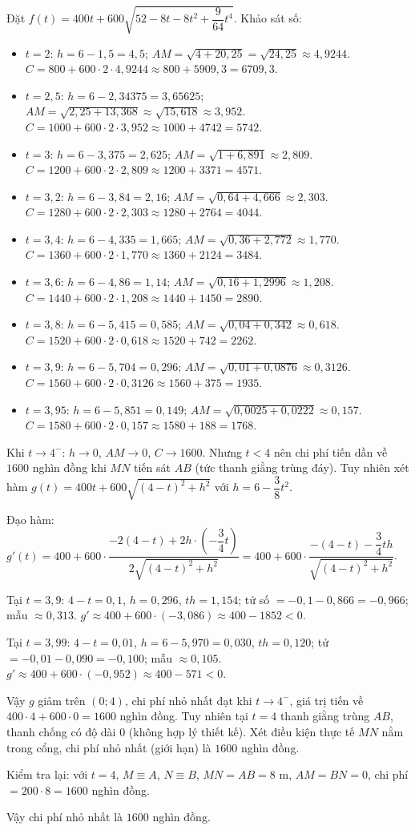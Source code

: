 \begin{bt}
{Đặt $f(t)=400t+600\sqrt{52-8t-8t^2+\dfrac{9}{64}t^4}$. Khảo sát số: 
\begin{itemize}
\item $t=2$: $h=6-1{,}5=4{,}5$; $AM=\sqrt{4+20{,}25}=\sqrt{24{,}25}\approx 4{,}9244$. $C=800+600\cdot 2\cdot 4{,}9244\approx 800+5909{,}3=6709{,}3$.
\item $t=2{,}5$: $h=6-2{,}34375=3{,}65625$; $AM=\sqrt{2{,}25+13{,}368}\approx\sqrt{15{,}618}\approx 3{,}952$. $C=1000+600\cdot 2\cdot 3{,}952\approx 1000+4742=5742$.
\item $t=3$: $h=6-3{,}375=2{,}625$; $AM=\sqrt{1+6{,}891}\approx 2{,}809$. $C=1200+600\cdot 2\cdot 2{,}809\approx 1200+3371=4571$.
\item $t=3{,}2$: $h=6-3{,}84=2{,}16$; $AM=\sqrt{0{,}64+4{,}666}\approx 2{,}303$. $C=1280+600\cdot 2\cdot 2{,}303\approx1280+2764=4044$.
\item $t=3{,}4$: $h=6-4{,}335=1{,}665$; $AM=\sqrt{0{,}36+2{,}772}\approx 1{,}770$. $C=1360+600\cdot 2\cdot 1{,}770\approx1360+2124=3484$.
\item $t=3{,}6$: $h=6-4{,}86=1{,}14$; $AM=\sqrt{0{,}16+1{,}2996}\approx 1{,}208$. $C=1440+600\cdot2\cdot1{,}208\approx1440+1450=2890$.
\item $t=3{,}8$: $h=6-5{,}415=0{,}585$; $AM=\sqrt{0{,}04+0{,}342}\approx 0{,}618$. $C=1520+600\cdot2\cdot0{,}618\approx1520+742=2262$.
\item $t=3{,}9$: $h=6-5{,}704=0{,}296$; $AM=\sqrt{0{,}01+0{,}0876}\approx0{,}3126$. $C=1560+600\cdot2\cdot0{,}3126\approx1560+375=1935$.
\item $t=3{,}95$: $h=6-5{,}851=0{,}149$; $AM=\sqrt{0{,}0025+0{,}0222}\approx0{,}157$. $C=1580+600\cdot2\cdot0{,}157\approx1580+188=1768$.
\end{itemize}
Khi $t\to 4^-$: $h\to 0$, $AM\to 0$, $C\to 1600$. Nhưng $t<4$ nên chi phí tiến dần về $1600$ nghìn đồng khi $MN$ tiến sát $AB$ (tức thanh giằng trùng đáy). Tuy nhiên xét hàm $g(t)=400t+600\sqrt{(4-t)^2+h^2}$ với $h=6-\dfrac{3}{8}t^2$.

Đạo hàm: $g'(t)=400+600\cdot\dfrac{-2(4-t)+2h\cdot\left(-\dfrac{3}{4}t\right)}{2\sqrt{(4-t)^2+h^2}}=400+600\cdot\dfrac{-(4-t)-\dfrac{3}{4}th}{\sqrt{(4-t)^2+h^2}}$.

Tại $t=3{,}9$: $4-t=0{,}1$, $h=0{,}296$, $th=1{,}154$; tử số $=-0{,}1-0{,}866=-0{,}966$; mẫu $\approx0{,}313$. $g'\approx400+600\cdot(-3{,}086)\approx400-1852<0$.

Tại $t=3{,}99$: $4-t=0{,}01$, $h=6-5{,}970=0{,}030$, $th=0{,}120$; tử $=-0{,}01-0{,}090=-0{,}100$; mẫu $\approx0{,}105$. $g'\approx400+600\cdot(-0{,}952)\approx400-571<0$.

Vậy $g$ giảm trên $(0;4)$, chi phí nhỏ nhất đạt khi $t\to4^-$, giá trị tiến về $400\cdot4+600\cdot0=1600$ nghìn đồng. Tuy nhiên tại $t=4$ thanh giằng trùng $AB$, thanh chống có độ dài $0$ (không hợp lý thiết kế). Xét điều kiện thực tế $MN$ nằm trong cổng, chi phí nhỏ nhất (giới hạn) là $1600$ nghìn đồng. 

Kiểm tra lại: với $t=4$, $M\equiv A$, $N\equiv B$, $MN=AB=8$ m, $AM=BN=0$, chi phí $=200\cdot8=1600$ nghìn đồng.

Vậy chi phí nhỏ nhất là $1600$ nghìn đồng.
}

\end{bt}

